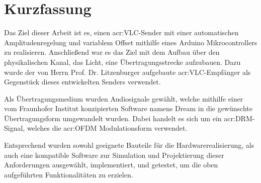

\chapter*{Kurzfassung}
\label{sec:abstract}

Das Ziel dieser Arbeit ist es, einen \gls{acr:VLC}-Sender mit einer automatischen Amplitudenregelung und variablem Offset mithilfe eines Arduino Mikrocontrollers zu realisieren. Anschließend war es das Ziel mit dem Aufbau über den physikalischen Kanal, das Licht, eine Übertragungsstrecke aufzubauen. Dazu wurde der von Herrn Prof. Dr. Litzenburger aufgebaute \gls{acr:VLC}-Empfänger als Gegenstück dieses entwickelten Senders verwendet.

Als Übertragungsmedium wurden Audiosignale gewählt, welche mithilfe einer vom Fraunhofer Institut konzipierten Software namens Dream in die gewünschte Übertragungsform umgewandelt wurden. Dabei handelt es sich um ein \gls{acr:DRM}-Signal, welches die \gls{acr:OFDM} Modulationsform verwendet.

Entsprechend wurden sowohl geeignete Bauteile für die Hardwarerealisierung, als auch eine kompatible Software zur Simulation und Projektierung dieser Anforderungen ausgewählt, implementiert, und getestet, um die oben aufgeführten Funktionalitäten zu erzielen.